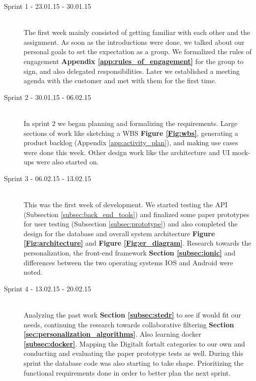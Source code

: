 \begin{description}
	
	\item[Sprint 1 - 23.01.15 - 30.01.15] \hfill \\ 
	The first week mainly consisted of getting familiar with each other and the assignment. As soon as the introductions were done, we talked about our personal goals to set the expectation as a group. We formalized the rules of engagement \textbf{Appendix \ref{app:rules_of_engagement}} for the group to sign, and also delegated responsibilities. Later we established a meeting agenda with the customer and met with them for the first time.
	
	\item[Sprint 2 - 30.01.15 - 06.02.15] \hfill \\ 
	In sprint 2 we began planning and formalizing the requirements. Large sections of work like sketching a WBS \textbf {Figure \ref{Fig:wbs}}, generating a product backlog (Appendix \ref{app:activity_plan}), and making use cases were done this week. Other design work like the architecture and UI mock-ups were also started on.
	
	\item[Sprint 3 - 06.02.15 - 13.02.15] \hfill \\ 
	This was the first week of development. We started testing the API (Subsection \ref{subsec:back_end_tools}) and finalized some paper prototypes for user testing (Subsection \ref{subsec:prototype}) and also completed the design for the database and overall system architecture \textbf {Figure \ref{Fig:architecture}} and \textbf {Figure \ref{Fig:er_diagram}}. Research towards the personalization, the front-end framework \textbf{Section \ref{subsec:ionic}}  and differences between the two operating systems IOS and Android were noted.
	
	\item[Sprint 4 - 13.02.15 - 20.02.15] \hfill \\ 
	Analyzing the past work \textbf {Section \ref{subsec:stedr}} to see if would fit our needs, continuing the research towards collaborative filtering \textbf {Section \ref{sec:personalization_algorithms}}. Also learning docker \textbf {\ref{subsec:docker}}. Mapping the Digitalt fortalt  categories to our own and conducting and evaluating the paper prototype tests as well. During this sprint the database code was also starting to take shape. Prioritizing the functional requirements done in order to better plan the next sprint.  
	

\end{description}
